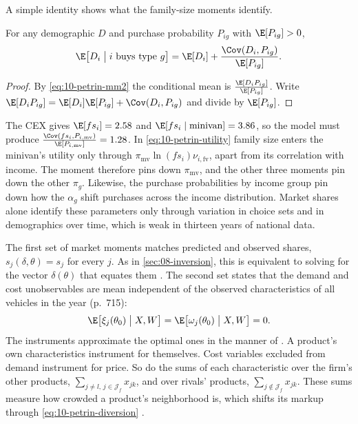 A simple identity shows what the family-size moments identify.

\begin{lemma}\label{lem:10-micro-moment}
For any demographic $D$ and purchase probability $P_{ig}$ with $\E[P_{ig}] > 0$,
\begin{equation*}
  \E\bigl[D_i \bigm| i \text{ buys type } g\bigr] = \E[D_i] + \frac{\Cov(D_i, P_{ig})}{\E[P_{ig}]} .
\end{equation*}
\end{lemma}

\begin{proof}
By \eqref{eq:10-petrin-mm2} the conditional mean is $\frac{\E[D_iP_{ig}]}{\E[P_{ig}]}$. Write $\E[D_iP_{ig}] =
\E[D_i]\E[P_{ig}] + \Cov(D_i, P_{ig})$ and divide by $\E[P_{ig}]$.
\end{proof}

The CEX gives $\E[fs_i] = 2.58$ and $\E[fs_i \mid \text{minivan}] = 3.86$, so the model must produce
$\frac{\Cov(fs_i, P_{i,\mathrm{mv}})}{\E[P_{i,\mathrm{mv}}]} = 1.28$.
In \eqref{eq:10-petrin-utility} family size enters the minivan's utility only through $\pi_{\mathrm{mv}}\ln(fs_i)
\nu_{i,\mathrm{fv}}$, apart from its correlation with income. The moment therefore pins down $\pi_{\mathrm{mv}}$, and the
other three moments pin down the other $\pi_g$. Likewise, the purchase probabilities by income group pin down how
the $\alpha_g$ shift purchases across the income distribution. Market shares alone identify these parameters only
through variation in choice sets and in demographics over time, which is weak in thirteen years of national data.

 The first set of market moments matches predicted and observed shares, $s_j(\delta, \theta) =
s_j$ for every $j$. As in \cref{sec:08-inversion}, this is equivalent to solving for the vector $\delta(\theta)$ that
equates them \citep{Berry1994}. The second set states that the demand and cost unobservables are mean independent of
the observed characteristics of all vehicles in the year (p.~715):
\begin{equation}\label{eq:10-petrin-blpmom}
  \E\bigl[\xi_j(\theta_0) \bigm| X, W\bigr] = \E\bigl[\omega_j(\theta_0) \bigm| X, W\bigr] = 0 .
\end{equation}
The instruments approximate the optimal ones in the manner of \citet{BerryLevinsohnPakes1995}. A product's own
characteristics instrument for themselves. Cost variables excluded from demand instrument for price. So do the sums
of each characteristic over the firm's other products, $\sum_{j\ne l,\, j\in\mathcal{J}_f}x_{jk}$, and over rivals'
products, $\sum_{j\notin\mathcal{J}_f}x_{jk}$. These sums measure how crowded a product's neighborhood is, which shifts
its markup through \eqref{eq:10-petrin-diversion} \citep{BresnahanSternTrajtenberg1997}.

